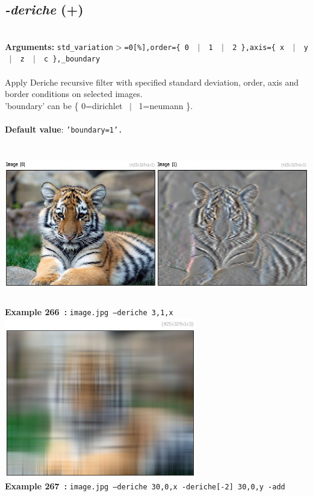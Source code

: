\documentclass[a4paper,11pt,twoside]{book}
\begin{document}
\subsection{\emph{-deriche} (+)}\vspace*{-0.5em}
~\\\textbf{Arguments: } 
{\small \texttt{std\_variation$>$=0[\%],order=\{ 0 ~$|$~ 1 ~$|$~ 2 \},axis=\{ x ~$|$~ y ~$|$~ z ~$|$~ c \},\_boundary}}\\~\\
Apply Deriche recursive filter with specified standard deviation, order, axis and border
conditions on selected images.
~\\'boundary' can be \{ 0=dirichlet ~$|$~ 1=neumann \}.
~\\~\\\textbf{Default value}: {\small \texttt{'boundary=1'.}}
\begin{center}\includegraphics[keepaspectratio=true,height=7cm,width=\textwidth]{img/gmic_def266.jpg}\\
{\footnotesize \textbf{Example 266~:} \texttt{image.jpg --deriche 3,1,x}}
\\\includegraphics[keepaspectratio=true,height=7cm,width=\textwidth]{img/gmic_def267.jpg}\\
{\footnotesize \textbf{Example 267~:} \texttt{image.jpg --deriche 30,0,x -deriche[-2] 30,0,y -add}}
\end{center}
\end{document}
